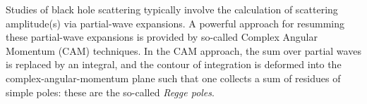 \documentclass[aps,prd,longbibliography,reprint,twocolumn,amsmath,amssymb,amsfonts,showpacs,footnote,superscriptaddress]{revtex4-1}%
\newcommand{\sam}[1]{\textcolor{red}{(Sam: #1)}}
\begin{document}
Studies of black hole scattering typically involve the calculation of scattering amplitude(s) via partial-wave expansions.  A powerful approach for resumming these partial-wave expansions is provided by so-called Complex Angular Momentum (CAM) techniques. In the CAM approach, the sum over partial waves is replaced by an integral, and the contour of integration is deformed into the complex-angular-momentum plane such that one collects a sum of residues of simple poles: these are the so-called \emph{Regge poles}.

\end{document}

